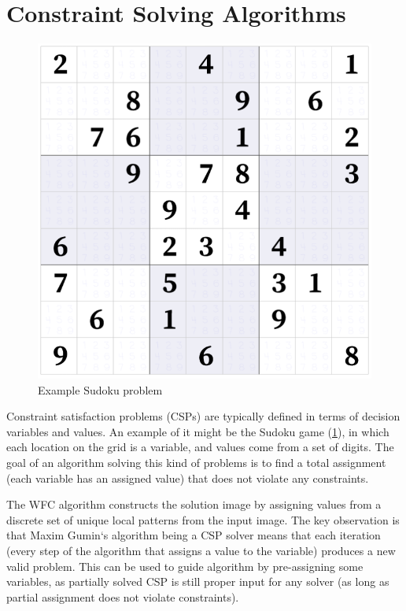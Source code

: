 \documentclass[shortabstract, english, inz]{iithesis}
\begin{document}
\section{Constraint Solving Algorithms}
\begin{figure}[H]
\centering
\includegraphics[width=1\textwidth, angle=0]{images/sudoku.png}
\caption{Example Sudoku problem \cite{sudoku}}
\label{fig:sudoku}
\end{figure}
Constraint satisfaction problems (CSPs) are typically defined in terms of decision variables and values. An example of it might be the Sudoku game (\ref{fig:sudoku}), in which each location on the grid is a variable, and values come from a set of digits. The goal of an algorithm solving this kind of problems is to find a total assignment (each variable has an assigned value) that does not violate any constraints.

The WFC algorithm constructs the solution image by assigning values from a discrete set of unique local patterns from the input image. \cite{Smith} The key observation is that Maxim Gumin`s algorithm being a CSP solver means that each iteration (every step of the algorithm that assigns a value to the variable) produces a new valid problem. This can be used to guide algorithm by pre-assigning some variables, as partially solved CSP is still proper input for any solver (as long as partial assignment does not violate constraints).
\end{document}
